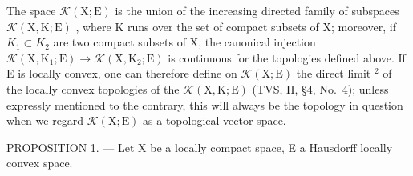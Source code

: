 The space \(\mathcal{K}(\mathrm{X};\mathrm{E})\) is the union of the increasing directed family of subspaces \(\mathcal{K}(\mathrm{X},\mathrm{K};\mathrm{E})\) , where K runs over the set of compact subsets of X; moreover, if \(K_{1}\subset K_{2}\) are two compact subsets of X, the canonical injection \(\mathcal{K}(\mathrm{X},\mathrm{K}_{1};\mathrm{E})\to\mathcal{K}(\mathrm{X},\mathrm{K}_{2};\mathrm{E})\) is continuous for the topologies defined above. If E is locally convex, one can therefore define on \(\mathcal{K}(\mathrm{X};\mathrm{E})\) the direct limit \(^{2}\) of the locally convex topologies of the \(\mathcal{K}(\mathrm{X},\mathrm{K};\mathrm{E})\) (TVS, II, §4, No.~4); unless expressly mentioned to the contrary, this will always be the topology in question when we regard \(\mathcal{K}(\mathrm{X};\mathrm{E})\) as a topological vector space.

PROPOSITION 1. --- Let X be a locally compact space, E a Hausdorff locally convex space.

